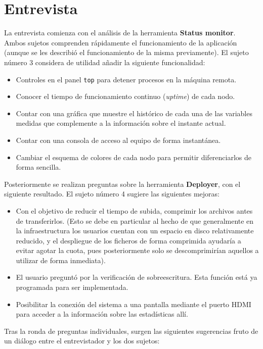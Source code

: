 \section{Entrevista}

La entrevista comienza con el análisis de la herramienta \textbf{Status monitor}. Ambos sujetos comprenden rápidamente el funcionamiento de la aplicación (aunque se les describió el funcionamiento de la misma previamente). El sujeto número 3 considera de utilidad añadir la siguiente funcionalidad:

\begin{itemize}
	\item Controles en el panel \texttt{top} para detener procesos en la máquina remota.
	\item Conocer el tiempo de funcionamiento continuo (\textit{uptime}) de cada nodo.
	\item Contar con una gráfica que muestre el histórico de cada una de las variables medidas que complemente a la información sobre el instante actual.
	\item Contar con una consola de acceso al equipo de forma instantánea.
	\item Cambiar el esquema de colores de cada nodo para permitir diferenciarlos de forma sencilla.
\end{itemize}



Posteriormente se realizan preguntas sobre la herramienta \textbf{Deployer}, con el siguiente resultado. El sujeto número 4 sugiere las siguientes mejoras:

\begin{itemize}
	\item Con el objetivo de reducir el tiempo de subida, comprimir los archivos antes de transferirlos. (Esto se debe en particular al hecho de que generalmente en la infraestructura los usuarios cuentan con un espacio en disco relativamente reducido, y el despliegue de los ficheros de forma comprimida ayudaría a evitar agotar la cuota, pues posteriormente solo se descomprimirían aquellos a utilizar de forma inmediata). 
	\item El usuario preguntó por la verificación de sobreescritura. Esta función está ya programada para ser implementada.
	\item Posibilitar la conexión del sistema a una pantalla mediante el puerto HDMI para acceder a la información sobre las estadísticas allí.
\end{itemize}

Tras la ronda de preguntas individuales, surgen las siguientes sugerencias fruto de un diálogo entre el entrevistador y los dos sujetos:

